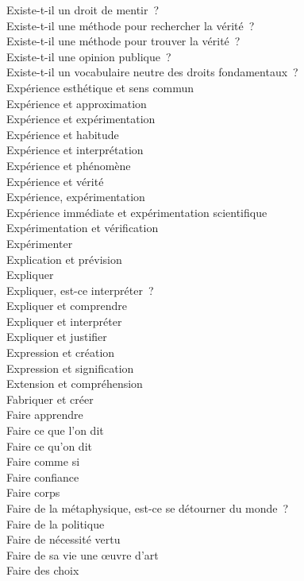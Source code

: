 \documentclass[a4paper,12pt]{article}
\begin{document}
Existe-t-il un droit de mentir ? \\
Existe-t-il une méthode pour rechercher la vérité ? \\
Existe-t-il une méthode pour trouver la vérité ? \\
Existe-t-il une opinion publique ? \\
Existe-t-il un vocabulaire neutre des droits fondamentaux ? \\
Expérience esthétique et sens commun \\
Expérience et approximation \\
Expérience et expérimentation \\
Expérience et habitude \\
Expérience et interprétation \\
Expérience et phénomène \\
Expérience et vérité \\
Expérience, expérimentation \\
Expérience immédiate et expérimentation scientifique \\
Expérimentation et vérification \\
Expérimenter \\
Explication et prévision \\
Expliquer \\
Expliquer, est-ce interpréter ? \\
Expliquer et comprendre \\
Expliquer et interpréter \\
Expliquer et justifier \\
Expression et création \\
Expression et signification \\
Extension et compréhension \\
Fabriquer et créer \\
Faire apprendre \\
Faire ce que l'on dit \\
Faire ce qu'on dit \\
Faire comme si \\
Faire confiance \\
Faire corps \\
Faire de la métaphysique, est-ce se détourner du monde ? \\
Faire de la politique \\
Faire de nécessité vertu \\
Faire de sa vie une œuvre d'art \\
Faire des choix \\
\end{document}
